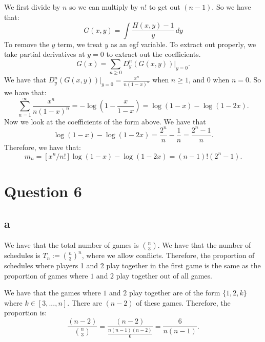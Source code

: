 \documentclass[]{article}
\theoremstyle{definition}
\numberwithin{theorem}{section}
\numberwithin{equation}{section}
\begin{document}
We first divide by $n$ so we can multiply by $n!$ to get out $(n - 1)$. So we have that:
\begin{equation}
	G(x,y) = \int \frac{H(x, y) - 1}{y} \, dy
\end{equation}
To remove the $y$ term, we treat $y$ as an egf variable. To extract out properly, we take partial derivatives at $y = 0$ to extract out the coefficients.
\begin{equation}
	G(x) = \sum_{n \geq 0} D^n_y(G(x, y))|_{y = 0}.
\end{equation}
We have that $D^n_y(G(x, y))|_{y = 0} = \frac{x^n}{n(1 - x)^n}$ when $n \geq 1$, and $0$ when $n = 0$. 
So we have that:
\begin{equation}
	\sum_{n = 1}^{\infty} \frac{x^n}{n(1 - x)^n} = - \log(1 - \frac{x}{1-x}) = \log(1-x) - \log(1-2x).
\end{equation}
Now we look at the coefficients of the form above. We have that 
\begin{equation}
	[x^n]\log(1 - x) - \log(1 - 2x) = \frac{2^n}{n} - \frac{1}{n}= \frac{2^{n} - 1}{n}.
\end{equation}
Therefore, we have that:
\begin{equation}
	m_n = [x^n/n!] \log(1 - x) - \log(1 - 2x) = (n-1)! (2^n - 1).
\end{equation}
\section{Question 6}

\subsection{a}
We have that the total number of games is $\binom{n}{3}$. We have that the number of schedules is $T_n := \binom{n}{3}^n$, where we allow conflicts. Therefore, the proportion of schedules where players 1 and 2 play together in the first game is the same as the proportion of games where $1$ and $2$ play together out of all games. 

We have that the games where $1$ and $2$ play together are of the form $\{ 1, 2, k\}$ where $k \in [3, ..., n]$. There are $(n-2)$ of these games.
Therefore, the proportion is:
\begin{equation}
	\frac{(n-2)}{\binom{n}{3}} = \frac{(n-2)}{\frac{n(n-1)(n-2)}{6}} = \frac{6}{n(n-1)}.
\end{equation}
\end{document}
